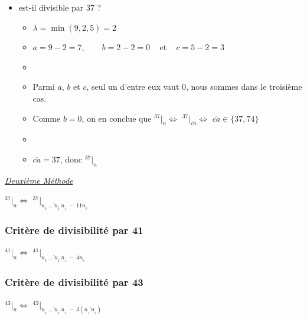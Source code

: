 \documentclass[a4paper, twoside]{article}
\begin{document}
	\begin{itemize}

		\item[]  est-il divisible par 37 ?
		\begin{itemize}
			\item[] $\lambda =\min(9, 2, 5) = 2$
			\item[] $a = 9 - 2 = 7$, ~~~ $b = 2 - 2 = 0$ ~ et ~ $c = 5 - 2 = 3$
			\item[]
			\item[] Parmi $a$, $b$ et $c$, seul un d'entre eux vaut $0$, nous sommes dans le troisième cas.
			\item[] Comme $b = 0$, on en conclue que {\Large $ ^{37}|_n \Leftrightarrow$ $^{37}|_{\overline{ca} } \Leftrightarrow$} $\overline{ca} \in \{37,74\}$
			\item[] 
			\item[] $\overline{ca} = 37$, donc {\Large $ ^{37}|_n$}\\
		\end{itemize}

	\end{itemize}



	{\noindent  \textit{\underline{Deuxième Méthode}}}

	\begin{center}
		\huge
		$ ^{37}|_n \Leftrightarrow$ $^{37}|_{\overline{n_{_{k}}~\dots~n_{_2}~n_{_1}}~-~11n_{_0}} $\\
	\end{center}


	\vfill
	{\noindent \dotfill}


	\subsubsection*{Critère de divisibilité par 41}

	\begin{center}
		\huge
		$ ^{41}|_n \Leftrightarrow$ $^{41}|_{\overline{n_{_{k}}~\dots~n_{_2}~n_{_1}}~-~4n_{_0}} $
	\end{center}


	\vfill
	{\noindent \dotfill}


	\subsubsection*{Critère de divisibilité par 43}

	\begin{center}
		\huge
		$ ^{43}|_n \Leftrightarrow$ $^{43}|_{\overline{n_{_{k}}~\dots~n_{_3}~n_{_2}}~-~3\left(\overline{n_{_1}~n_{_0}}\right)} $
	\end{center}
\end{document}
